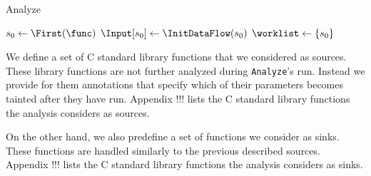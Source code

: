 \IncMargin{1em}
\begin{algorithm}
\caption{Analyze}\label{fig:algoAnalyze}
\SetAlgoLined
\LinesNumbered
\DontPrintSemicolon
{}


\OutData{}
$ s_0 \leftarrow \First(\func)$\;
$\Input[s_0] \leftarrow \InitDataFlow(s_0)$\;
$\worklist \leftarrow \set{s_0}$\;
\While{ $\worklist\ \neq\ \emptyset$ }{
	$\varI \leftarrow \Next(\worklist)$\;
	$\Output[i] \leftarrow \InterFlow(\AnalyzeAlgo, \varI)$\;
	\ForEach{ $\varJ \in \Succs(\varI)$ }{
		\If{ $\Output[\varI] \not\sqsubseteq \Input[\varJ]$}{
			$\Input[\varJ] \leftarrow \Input[\varJ] \sqcup \Output[\varI]$\;
			$\worklist \leftarrow \worklist \cup\ \set{\varJ}$\;
		}	
	}
}
\end{algorithm}
\DecMargin{1em}
We define a set of C standard library functions that
we considered as sources. These library functions are not
further analyzed during \texttt{Analyze}'s run.
Instead we provide for them annotations that specify
which of their parameters becomes tainted after they
have run. Appendix !!! lists the C standard library
functions the analysis considers as sources.

On the other hand, we also predefine a set of functions
we consider as sinks. These functions are handled similarly
to the previous described sources. Appendix !!! lists
the C standard library functions the analysis considers
as sinks.

